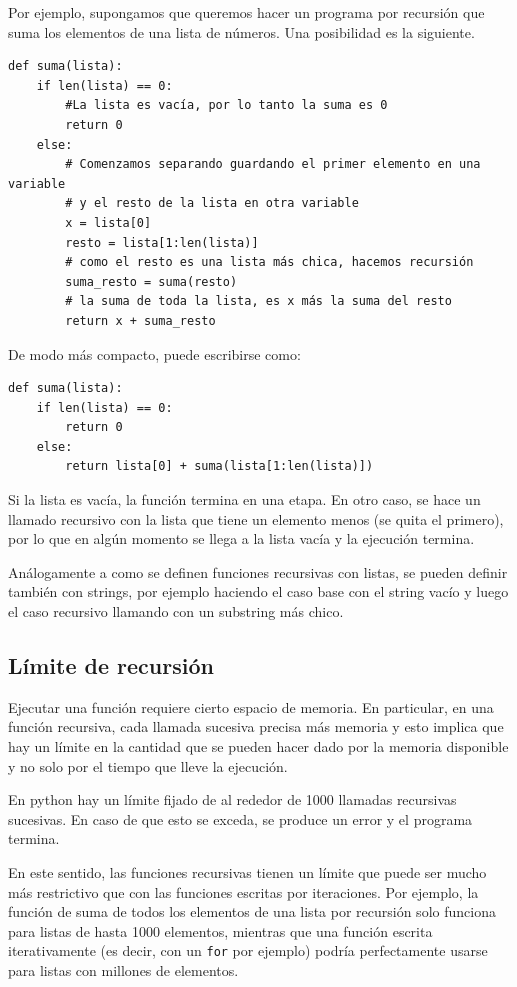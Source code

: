 \documentclass[a4paper, 12pt]{report}
\theoremstyle{definition}
\begin{document}
Por ejemplo, supongamos que queremos hacer un programa por recursión que suma los elementos de una lista de números. Una posibilidad es la siguiente.
\begin{verbatim}
def suma(lista):
    if len(lista) == 0:
        #La lista es vacía, por lo tanto la suma es 0
        return 0
    else:
        # Comenzamos separando guardando el primer elemento en una variable
        # y el resto de la lista en otra variable
        x = lista[0]
        resto = lista[1:len(lista)]
        # como el resto es una lista más chica, hacemos recursión
        suma_resto = suma(resto)
        # la suma de toda la lista, es x más la suma del resto
        return x + suma_resto
\end{verbatim}
De modo más compacto, puede escribirse como:
\begin{verbatim}
def suma(lista):
    if len(lista) == 0:
        return 0
    else:
        return lista[0] + suma(lista[1:len(lista)])
\end{verbatim}
Si la lista es vacía, la función termina en una etapa. En otro caso, se hace un llamado recursivo con la lista que tiene un elemento menos (se quita el primero), por lo que en algún momento se llega a la lista vacía y la ejecución termina.

Análogamente a como se definen funciones recursivas con listas, se pueden definir también con strings, por ejemplo haciendo el caso base con el string vacío y luego el caso recursivo llamando con un substring más chico.

\subsection{Límite de recursión}

Ejecutar una función requiere cierto espacio de memoria. En particular, en una función recursiva, cada llamada sucesiva precisa más memoria y esto implica que hay un límite en la cantidad que se pueden hacer dado por la memoria disponible y no solo por el tiempo que lleve la ejecución.

En python hay un límite fijado de al rededor de 1000 llamadas recursivas sucesivas. En caso de que esto se exceda, se produce un error y el programa termina.

En este sentido, las funciones recursivas tienen un límite que puede ser mucho más restrictivo que con las funciones escritas por iteraciones. Por ejemplo, la función de suma de todos los elementos de una lista por recursión solo funciona para listas de hasta 1000 elementos, mientras que una función escrita iterativamente (es decir, con un {\tt for} por ejemplo) podría perfectamente usarse para listas con millones de elementos.
\end{document}
